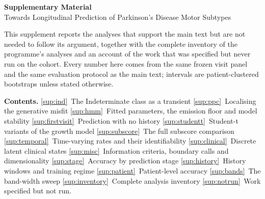 
\setcounter{section}{0}
\setcounter{figure}{0}
\setcounter{table}{0}
\renewcommand{\thesection}{S\arabic{section}}
\renewcommand{\thesubsection}{S\arabic{section}.\arabic{subsection}}
\renewcommand{\theHsection}{supp.\arabic{section}}
\renewcommand{\theHsubsection}{supp.\arabic{section}.\arabic{subsection}}
\renewcommand{\theHfigure}{suppF.\arabic{figure}}
\renewcommand{\theHtable}{suppT.\arabic{table}}
\renewcommand{\thefigure}{S\arabic{figure}}
\renewcommand{\thetable}{S\arabic{table}}
\renewcommand{\theequation}{S\arabic{equation}}
\setcounter{equation}{0}

\begin{center}
{\LARGE\bfseries Supplementary Material}\\[4pt]
{\large Towards Longitudinal Prediction of Parkinson's Disease Motor Subtypes}
\end{center}

\vspace{6pt}
\noindent
This supplement reports the analyses that support the main text but are not
needed to follow its argument, together with the complete inventory of the
programme's analyses and an account of the work that was specified but never run
on the cohort. Every number here comes from the same frozen visit panel and the
same evaluation protocol as the main text; intervals are patient-clustered
bootstraps unless stated otherwise.

\vspace{6pt}
\noindent
\textbf{Contents.}
\ref{sup:ind}~The Indeterminate class as a transient \textbullet{}
\ref{sup:ppc}~Localising the generative misfit \textbullet{}
\ref{sup:hmm}~Fitted parameters, the emission floor and model stability \textbullet{}
\ref{sup:firstvisit}~Prediction with no history \textbullet{}
\ref{sup:studentt}~Student-t variants of the growth model \textbullet{}
\ref{sup:subscore}~The full subscore comparison \textbullet{}
\ref{sup:temporal}~Time-varying rates and their identifiability \textbullet{}
\ref{sup:clinical}~Discrete latent clinical states \textbullet{}
\ref{sup:misc}~Information criteria, boundary calls and dimensionality \textbullet{}
\ref{sup:stage}~Accuracy by prediction stage \textbullet{}
\ref{sup:history}~History windows and training regime \textbullet{}
\ref{sup:patient}~Patient-level accuracy \textbullet{}
\ref{sup:bands}~The band-width sweep \textbullet{}
\ref{sup:inventory}~Complete analysis inventory \textbullet{}
\ref{sup:notrun}~Work specified but not run.

